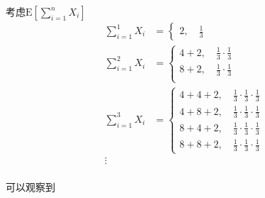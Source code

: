 \documentclass{article}
\begin{document}
\begin{enumerate}[(a)]
            考虑$\text{E}[\sum_{i=1}^nX_i]$
            \begin{equation*}
                \begin{aligned}
                    \sum_{i=1}^1X_i&=\begin{cases}
                        2,\quad\frac{1}{3}
                    \end{cases}\\
                    \sum_{i=1}^2X_i&=\begin{cases}
                        4+2,\quad\frac{1}{3}\cdot\frac{1}{3}\\
                        8+2,\quad\frac{1}{3}\cdot\frac{1}{3}\\
                    \end{cases}\\
                    \sum_{i=1}^3X_i&=\begin{cases}
                        4+4+2,\quad\frac{1}{3}\cdot\frac{1}{3}\cdot\frac{1}{3}\\
                        4+8+2,\quad\frac{1}{3}\cdot\frac{1}{3}\cdot\frac{1}{3}\\
                        8+4+2,\quad\frac{1}{3}\cdot\frac{1}{3}\cdot\frac{1}{3}\\
                        8+8+2,\quad\frac{1}{3}\cdot\frac{1}{3}\cdot\frac{1}{3}
                    \end{cases}\\
                    \vdots\\
                \end{aligned}
            \end{equation*} 

            可以观察到
            


\end{enumerate}
\end{document}

